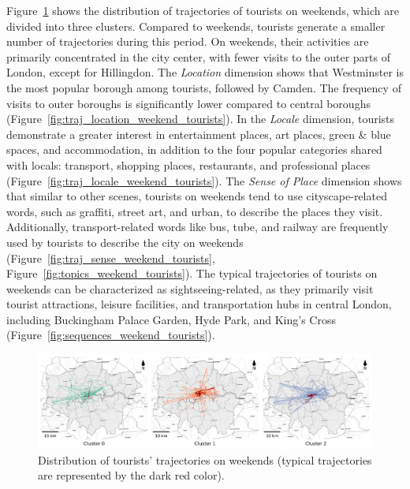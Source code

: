 \documentclass{article}
\theoremstyle{definition}
\theoremstyle{remark}
\begin{document}
Figure~\ref{fig:traj_distribution_weekend_tourists} shows the distribution of trajectories of tourists on weekends, which are divided into three clusters. Compared to weekends, tourists generate a smaller number of trajectories during this period. On weekends, their activities are primarily concentrated in the city center, with fewer visits to the outer parts of London, except for Hillingdon. The \textit{Location} dimension shows that Westminster is the most popular borough among tourists, followed by Camden. The frequency of visits to outer boroughs is significantly lower compared to central boroughs (Figure~\ref{fig:traj_location_weekend_tourists}). In the \textit{Locale} dimension, tourists demonstrate a greater interest in entertainment places, art places, green \& blue spaces, and accommodation, in addition to the four popular categories shared with locals: transport, shopping places, restaurants, and professional places (Figure~\ref{fig:traj_locale_weekend_tourists}). The \textit{Sense of Place} dimension shows that similar to other scenes, tourists on weekends tend to use cityscape-related words, such as graffiti, street art, and urban, to describe the places they visit. Additionally, transport-related words like bus, tube, and railway are frequently used by tourists to describe the city on weekends (Figure~\ref{fig:traj_sense_weekend_tourists}, Figure~\ref{fig:topics_weekend_tourists}). The typical trajectories of tourists on weekends can be characterized as sightseeing-related, as they primarily visit tourist attractions, leisure facilities, and transportation hubs in central London, including Buckingham Palace Garden, Hyde Park, and King's Cross (Figure~\ref{fig:sequences_weekend_tourists}).

\begin{figure}[!h]
\centering
\includegraphics[width=1\textwidth]{figures/traj_distribution_weekend_tourists.png}
\caption{\label{fig:traj_distribution_weekend_tourists}Distribution of tourists' trajectories on weekends (typical trajectories are represented by the dark red color).}
\end{figure}
\end{document}
